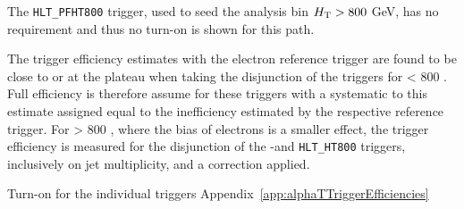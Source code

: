 The \verb!HLT_PFHT800! 
trigger, used to seed the analysis bin $\mbox{$H_\text{T}$} > 800$ GeV, 
has no \alt requirement and thus no \alt turn-on is shown for this path.

{
The trigger efficiency estimates with the electron reference trigger are found to be close to or at the plateau when taking the disjunction of the 
triggers for \scalht < 800 \GeV. Full efficiency is therefore assume for these triggers with a systematic to this estimate assigned equal to the 
inefficiency estimated by the respective reference trigger. For \scalht > 800 \GeV, where the bias of electrons is a smaller effect, the trigger 
efficiency is measured for the disjunction of the \scalht-\alphat and \verb!HLT_HT800! triggers, inclusively on jet multiplicity, and a correction applied. 


Turn-on for the individual triggers \alphat Appendix~\ref{app:alphaTTriggerEfficiencies}
}



\begin{figure}[h!]
  \begin{center}
     ~~ 
    \caption{
          }
    \label{fig:alphat_turnons}
  \end{center} 
\end{figure}



